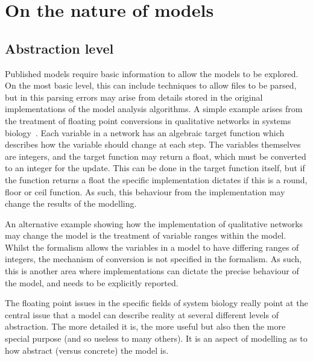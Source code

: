 \documentclass[conference]{IEEEtran}
\begin{document}

\section{On the nature of models}


\subsection{Abstraction level} 

Published models require basic information to allow the models to be
explored. On the most basic level, this can include techniques to allow
files to be parsed, but in this parsing errors may arise from details 
stored in the original implementations of the model analysis algorithms.
A simple example arises from the treatment of floating point conversions
in qualitative networks in systems biology~\cite{Schaub2007}. Each
variable in a network has an algebraic target function which describes
how the variable should change at each step. The variables themselves are
integers, and the target function may return a float, which must be converted
to an integer for the update. This can be done in the target function 
itself, but if the function returns a float the specific implementation
dictates if this is a round, floor or ceil function. As such, this behaviour
from the implementation may change the results of the modelling.

An alternative example showing how the implementation of qualitative networks
may change the model is the treatment of variable ranges within the model.
Whilst the formalism allows the variables in a model to have differing 
ranges of integers, the mechanism of conversion is not specified in the 
formalism. As such, this is another area where implementations can dictate
the precise behaviour of the model, and needs to be explicitly reported.

The floating point issues in the specific fields of system biology
really point at the central issue that a model can describe reality at
several different levels of abstraction. The more detailed it is, the
more useful but also then the more special purpose (and so useless to
many others). It is an aspect of modelling as to how abstract (versus
concrete) the model is.


\end{document}
